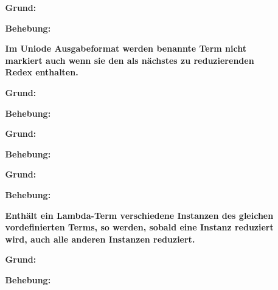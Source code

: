 \documentclass[parskip=full,11pt,openany]{scrreprt}
\begin{document}
\begin{itemize}[itemsep=3ex]
\item[] %
\begin{itemize}[noitemsep]
\item[] {\bfseries  }
\item [\textbf{Grund:}]
\item [\textbf{Behebung:}]
\end{itemize}

\item[] %
\begin{itemize}[noitemsep]
\item[] {\bfseries Im Uniode Ausgabeformat werden benannte Term nicht markiert auch wenn sie den als nächstes zu reduzierenden Redex enthalten. }
\item [\textbf{Grund:}]
\item [\textbf{Behebung:}]
\end{itemize}

\item[] %
\begin{itemize}[noitemsep]
\item[] {\bfseries  }
\item [\textbf{Grund:}]
\item [\textbf{Behebung:}]
\end{itemize}

\item[] %
\begin{itemize}[noitemsep]
\item[] {\bfseries  }
\item [\textbf{Grund:}]
\item [\textbf{Behebung:}]
\end{itemize}

\item[] %
\begin{itemize}[noitemsep]
\item[] {\bfseries Enthält ein Lambda-Term  verschiedene Instanzen des gleichen vordefinierten Terms, so werden, sobald eine Instanz reduziert wird, auch alle anderen Instanzen reduziert. }
\item [\textbf{Grund:}]
\item [\textbf{Behebung:}]
\end{itemize}

\end{itemize}
\end{document}
